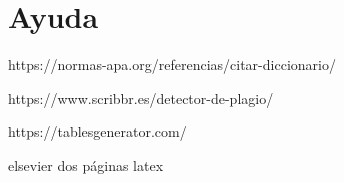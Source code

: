 \documentclass[3p,twocolumn]{elsarticle}
\begin{document}
\section{Ayuda}

https://normas-apa.org/referencias/citar-diccionario/

https://www.scribbr.es/detector-de-plagio/

https://tablesgenerator.com/

elsevier dos páginas latex
\end{document}
